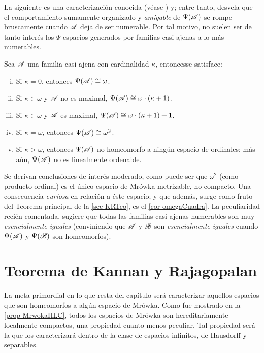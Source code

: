 La siguiente es una caracterización conocida (véase \cite[p.~39,45]{GeorginaTesis}) y; entre tanto, desvela que el comportamiento sumamente organizado y \textit{amigable} de $\Psi(\mathscr{A})$ se rompe bruscamente cuando $\mathscr{A}$ deja de ser numerable. Por tal motivo, no suelen ser de tanto interés los $\Psi$-espacios generados por familias casi ajenas a lo más numerables.

\begin{proposicion}\label{prop-alomasNumCaract}
	Sea $\mathscr{A}$ una familia casi ajena con cardinalidad $\kappa$, entonces\footnotemark se satisface:
	\begin{enumerate}[i)]
		\item Si $\kappa=0$, entonces $\Psi(\mathscr{A}) \cong \omega$.
		\item Si $\kappa \in \omega$ y $\mathscr{A}$ no es maximal, $\Psi(\mathscr{A}) \cong \omega \cdot (\kappa+1)$.
		\item Si $\kappa \in \omega$ y $\mathscr{A}$ es maximal, $\Psi(\mathscr{A}) \cong \omega \cdot (\kappa+1)+1$.
		\item Si $\kappa=\omega$, entonces $\Psi(\mathscr{A}) \cong \omega^2$.
		\item Si $\kappa>\omega$, entonces $\Psi(\mathscr{A})$ no homeomorfo a ningún espacio de ordinales; más aún, $\Psi(\mathscr{A})$ no es linealmente ordenable.
	\end{enumerate}
\end{proposicion}


Se derivan conclusiones de interés moderado, como puede ser que $\omega^2$ (como producto ordinal) es el único espacio de Mrówka metrizable, no compacto. Una consecuencia \textit{curiosa} en relación a éste espacio; y que además, surge como fruto del Teorema principal de la \autoref{sec-KRTeo}, es el \autoref{cor-omegaCuadra}.
\label{Dif-esencial}
La peculiaridad recién comentada, sugiere que todas las familias casi ajenas numerables son muy \textit{esencialmente iguales} (conviniendo que $\mathscr{A}$ y $\mathscr{B}$ son \textit{esencialmente iguales} cuando $\Psi(\mathscr{A})$ y $\Psi(\mathscr{B})$ son homeomorfos).

\section{Teorema de Kannan y Rajagopalan}
\label{sec-KRTeo}
La meta primordial en lo que resta del capítulo será caracterizar aquellos espacios que son homeomorfos a algún espacio de Mrówka. Como fue mostrado en la \autoref{prop-MrwokaHLC}, todos los espacios de Mrówka son hereditariamente localmente compactos, una propiedad cuanto menos peculiar. Tal propiedad será la que los caracterizará dentro de la clase de espacios infinitos, de Hausdorff y separables.

